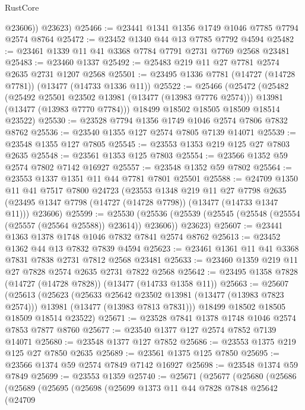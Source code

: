 \begin{lexlean}{RustCore}
\begin{coremodule}
          @23606))
      @23623)
@25466 := @23441 @1341 @1356 @1749 @1046 @7785 @7794 @2574 @8764
@25472 := @23452 @1340 @44 @13 @7785 @7792 @4594
@25482 := @23461 @1339 @11 @41 @3368 @7784 @7791 @2731 @7769 @2568 @23481
@25483 := @23460 @1337
@25492 := @25483 @219 @11 @27 @7781 @2574 @2635 @2731 @1207 @2568
@25501 := @23495 @1336 @7781 (@14727 (@14728 @7781)) (@13477 (@14733 @1336 @11))
@25522 := @25466
    (@25472
      (@25482
        (@25492 @25501 @23502 @13981 (@13477 (@13983 @7776 @2574)))
        @13981
        (@13477 (@13983 @7770 @7784)))
      @18499
      @18502
      @18505
      @18509
      @18514
      @23522)
@25530 := @23528 @7794 @1356 @1749 @1046 @2574 @7806 @7832 @8762
@25536 := @23540 @1355 @127 @2574 @7805 @7139 @14071
@25539 := @23548 @1355 @127 @7805
@25545 := @23553 @1353 @219 @125 @27 @7803 @2635
@25548 := @23561 @1353 @125 @7803
@25554 := @23566 @1352 @59 @2574 @7802 @7142 @16927
@25557 := @23548 @1352 @59 @7802
@25564 := @23553 @1337 @1351 @11 @44 @7781 @7801 @25501
@25588 := @24709
    @1350
    @11
    @41
    @7517
    @7800
    @24723
    (@23553
      @1348
      @219
      @11
      @27
      @7798
      @2635
      (@23495 @1347 @7798 (@14727 (@14728 @7798)) (@13477 (@14733 @1347 @11)))
      @23606)
@25599 := @25530
    (@25536 (@25539 (@25545 (@25548 (@25554 (@25557 (@25564 @25588)) @23614)) @23606)) @23623)
@25607 := @23441 @1363 @1378 @1748 @1046 @7832 @7841 @2574 @8762
@25613 := @23452 @1362 @44 @13 @7832 @7839 @4594
@25623 := @23461 @1361 @11 @41 @3368 @7831 @7838 @2731 @7812 @2568 @23481
@25633 := @23460 @1359 @219 @11 @27 @7828 @2574 @2635 @2731 @7822 @2568
@25642 := @23495 @1358 @7828 (@14727 (@14728 @7828)) (@13477 (@14733 @1358 @11))
@25663 := @25607
    (@25613
      (@25623
        (@25633 @25642 @23502 @13981 (@13477 (@13983 @7823 @2574)))
        @13981
        (@13477 (@13983 @7813 @7831)))
      @18499
      @18502
      @18505
      @18509
      @18514
      @23522)
@25671 := @23528 @7841 @1378 @1748 @1046 @2574 @7853 @7877 @8760
@25677 := @23540 @1377 @127 @2574 @7852 @7139 @14071
@25680 := @23548 @1377 @127 @7852
@25686 := @23553 @1375 @219 @125 @27 @7850 @2635
@25689 := @23561 @1375 @125 @7850
@25695 := @23566 @1374 @59 @2574 @7849 @7142 @16927
@25698 := @23548 @1374 @59 @7849
@25699 := @23553 @1359
@25740 := @25671
    (@25677
      (@25680
        (@25686
          (@25689
            (@25695
              (@25698
                (@25699
                  @1373
                  @11
                  @44
                  @7828
                  @7848
                  @25642
                  (@24709

\end{coremodule}
\end{lexlean}
